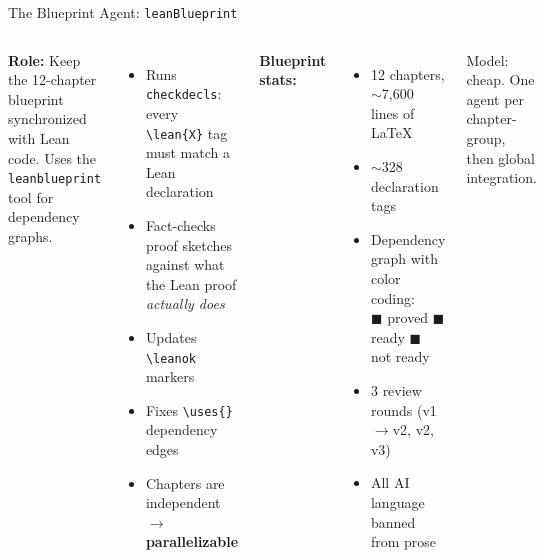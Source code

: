 \documentclass[aspectratio=169,10pt]{beamer}
\begin{document}
\begin{frame}{The Blueprint Agent: \texttt{leanBlueprint}}
    \begin{columns}[T]
        \textcolor{deepblue}{\textbf{Role:}} Keep the 12-chapter blueprint synchronized with Lean code. Uses the \texttt{leanblueprint} tool for dependency graphs.
        \vspace{0.3em}
        \begin{itemize}
            \item Runs \texttt{checkdecls}: every \texttt{\textbackslash lean\{X\}} tag must match a Lean declaration
            \item Fact-checks proof sketches against what the Lean proof \emph{actually does}
            \item Updates \texttt{\textbackslash leanok} markers
            \item Fixes \texttt{\textbackslash uses\{\}} dependency edges
            \item Chapters are independent $\to$ \textbf{parallelizable}
        \end{itemize}
        \textbf{Blueprint stats:}
        \begin{itemize}
            \item 12 chapters, $\sim$7{,}600 lines of \LaTeX
            \item $\sim$328 declaration tags
            \item Dependency graph with color coding:\\
              {\scriptsize \textcolor{leangreen}{$\blacksquare$} proved \quad \textcolor{leanblue}{$\blacksquare$} ready \quad \textcolor{amber}{$\blacksquare$} not ready}
            \item 3 review rounds (v1$\to$v2, v2, v3)
            \item All AI language banned from prose
        \end{itemize}
        \vspace{0.3em}
        \textcolor{dimwhite}{\footnotesize Model: cheap. One agent per chapter-group, then global integration.}
    \end{columns}
\end{frame}
\end{document}
